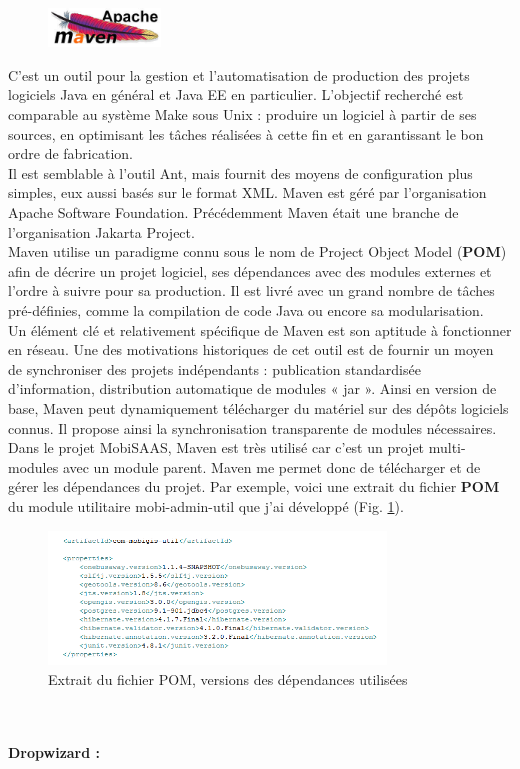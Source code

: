\begin{itemize}
\begin{figure}
\centering
\includegraphics[width=3cm]{images/apacheMaven.jpg}
\end{figure}
\noindent C'est un outil pour la gestion et l'automatisation de production des projets logiciels Java en général et Java EE en particulier. L'objectif recherché est comparable au système Make sous Unix : produire un logiciel à partir de ses sources, en optimisant les tâches réalisées à cette fin et en garantissant le bon ordre de fabrication.\\
Il est semblable à l'outil Ant, mais fournit des moyens de configuration plus simples, eux aussi basés sur le format XML. Maven est géré par l'organisation Apache Software Foundation. Précédemment Maven était une branche de l'organisation Jakarta Project.\\
Maven utilise un paradigme connu sous le nom de Project Object Model (\textbf{POM}) afin de décrire un projet logiciel, ses dépendances avec des modules externes et l'ordre à suivre pour sa production. Il est livré avec un grand nombre de tâches pré-définies, comme la compilation de code Java ou encore sa modularisation.\\
Un élément clé et relativement spécifique de Maven est son aptitude à fonctionner en réseau. Une des motivations historiques de cet outil est de fournir un moyen de synchroniser des projets indépendants : publication standardisée d'information, distribution automatique de modules « jar ». Ainsi en version de base, Maven peut dynamiquement télécharger du matériel sur des dépôts logiciels connus. Il propose ainsi la synchronisation transparente de modules nécessaires.\\

Dans le projet MobiSAAS, Maven est très utilisé car c'est un projet multi-modules avec un module parent. Maven me permet donc de télécharger et de gérer les dépendances du projet. Par exemple, voici une extrait du fichier \textbf{POM} du module utilitaire \og mobi-admin-util \fg que j'ai développé (Fig. \ref{fig:MavenPOM}).\\

\begin{figure}[!h]
	\centering
		\includegraphics[width=0.8\textwidth]{images/Maven_POM_properties_Mobi-Admin-util.PNG}
	\caption{\label{fig:MavenPOM}Extrait du fichier POM, versions des dépendances utilisées}
\end{figure}
\\
~\\
\textbf{Dropwizard :}\label{Dropwizard}


\end{itemize}
